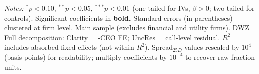 \begin{landscape}
\begin{table}[H]
\begin{minipage}{\linewidth}
\vspace{2pt}\scriptsize
\textit{Notes:} $^{*}p<0.10$, $^{**}p<0.05$, $^{***}p<0.01$ (one-tailed for IVs, $\beta > 0$; two-tailed for controls).
 Significant coefficients in \textbf{bold}.
 Standard errors (in parentheses) clustered at firm level.
 Main sample (excludes financial and utility firms). DWZ Full decomposition: Clarity = -CEO FE; UncRes = call-level residual.
 $R^2$ includes absorbed fixed effects (not within-$R^2$).
 Spread$_{25D}$ values rescaled by $10^4$ (basis points) for readability; multiply coefficients by $10^{-4}$ to recover raw fraction units.
\end{minipage}
\end{table}
\end{landscape}